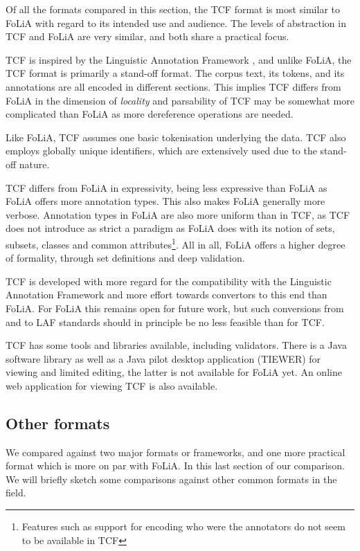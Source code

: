 \documentclass[a4paper,10pt,twoside]{article}
\begin{document}
Of all the formats compared in this section, the TCF format is most similar to
FoLiA with regard to its intended use and audience. The levels of abstraction in
TCF and FoLiA are very similar, and both share a practical focus.

TCF is inspired by the Linguistic Annotation Framework \cite{LAF}, and unlike
FoLiA, the TCF format is primarily a stand-off format. The corpus text, its
tokens, and its annotations are all encoded in different sections.  This
implies TCF differs from FoLiA in the dimension of \emph{locality} and
parsability of TCF may be somewhat more complicated than FoLiA as more
dereference operations are needed.

Like FoLiA, TCF assumes one basic tokenisation underlying the data. TCF also
employs globally unique identifiers, which are extensively used due to the
stand-off nature.

TCF differs from FoLiA in expressivity, being less expressive than FoLiA as
FoLiA offers more annotation types. This also makes FoLiA generally more verbose.
Annotation types in FoLiA are also more uniform than in TCF, as TCF does not
introduce as strict a paradigm as FoLiA does with its notion of sets, subsets,
classes and common attributes\footnote{Features such as support for encoding who were the annotators do not seem to be available in TCF}.  All in all, FoLiA offers a higher degree of formality, through set
definitions and deep validation.

TCF is developed with more regard for the compatibility with the Linguistic
Annotation Framework \cite{LAF} and more effort towards convertors to this end
than FoLiA. For FoLiA this remains open for future work, but such conversions
from and to LAF standards should in principle be no less feasible than for TCF.

TCF has some tools and libraries available, including validators. There is a
Java software library as well as a Java pilot desktop application (TIEWER) for
viewing and limited editing, the latter is not available for FoLiA yet. An
online web application for viewing TCF is also available.

\subsection{Other formats}

We compared against two major formats or frameworks, and one more practical format which is
more on par with FoLiA. In this last section of our comparison. We will briefly
sketch some comparisons against other common formats in the field.
\end{document}
